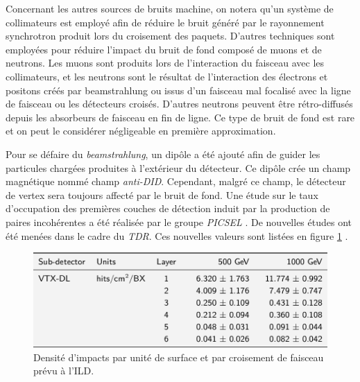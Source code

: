   \medskip
  
  Concernant les autres sources de bruits machine, on notera qu'un syst\`eme de collimateurs est employ\'e afin de réduire le bruit g\'en\'er\'e par le rayonnement synchrotron produit lors du croisement des paquets. D'autres techniques sont employ\'ees pour r\'eduire l'impact du bruit de fond compos\'e de muons et de neutrons. Les muons sont produits lors de l'interaction du faisceau avec les collimateurs, et les neutrons sont le r\'esultat de l'interaction des \'electrons et positons cr\'e\'es par beamstrahlung ou issus d'un faisceau mal focalis\'e avec la ligne de faisceau ou les d\'etecteurs crois\'es. D'autres neutrons peuvent \^etre r\'etro-diffus\'es depuis les absorbeurs de faisceau en fin de ligne. Ce type de bruit de fond est rare et on peut le consid\'erer n\'egligeable en premi\`ere approximation.
  
  \medskip
  
  Pour se d\'efaire du \textit{beamstrahlung}, un dipôle a \'et\'e ajout\'e afin de guider les particules charg\'ees produites \`a l'ext\'erieur du d\'etecteur. Ce dipôle cr\'ee un champ magn\'etique nomm\'e champ \textit{anti-DID}. Cependant, malgr\'e ce champ, le d\'etecteur de vertex sera toujours affect\'e par le bruit de fond. Une \'etude sur le taux d'occupation des premi\`eres couches de d\'etection induit par la production de paires incoh\'erentes a \'et\'e r\'ealis\'ee par le groupe \textit{PICSEL} \cite{2009arXiv0902.2707D}. De nouvelles \'etudes ont \'et\'e men\'ees dans le cadre du \textit{TDR}. Ces nouvelles valeurs sont list\'ees en figure \ref{fig:tx_occupation} \cite{Vogel:2008zza}.
  
  \begin{figure}[!htb]
    \begin{center} 
      \includegraphics[scale=0.40]{./figures/table_beamstrahlung.png}
      \caption{Densit\'e d'impacts par unit\'e de surface et par croisement de faisceau pr\'evu \`a l'ILD.}
      \label{fig:tx_occupation}
    \end{center}
  \end{figure}
  
